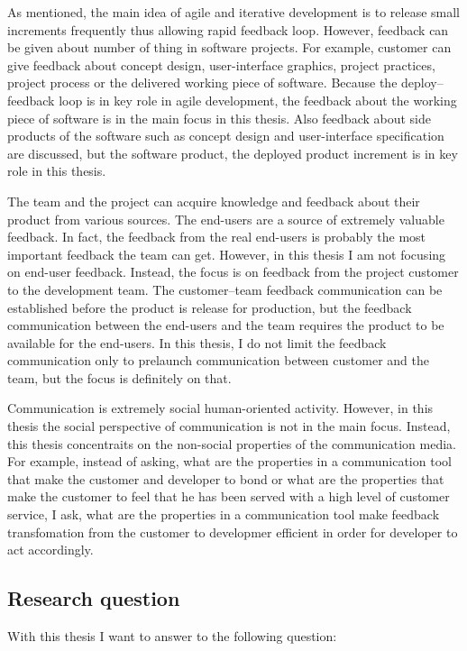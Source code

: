 \documentclass[english,12pt,a4paper,pdftex]{article}
\begin{document}
As mentioned, the main idea of agile and iterative development is to release small increments frequently thus allowing rapid feedback loop. However, feedback can be given about number of thing in software projects. For example, customer can give feedback about concept design, user-interface graphics, project practices, project process or the delivered working piece of software. Because the deploy--feedback loop is in key role in agile development, the feedback about the working piece of software is in the main focus in this thesis. Also feedback about side products of the software such as concept design and user-interface specification are discussed, but the software product, the deployed product increment is in key role in this thesis.

The team and the project can acquire knowledge and feedback about their product from various sources. The end-users are a source of extremely valuable feedback. In fact, the feedback from the real end-users is probably the most important feedback the team can get. However, in this thesis I am not focusing on end-user feedback. Instead, the focus is on feedback from the project customer to the development team. The customer--team feedback communication can be established before the product is release for production, but the feedback communication between the end-users and the team requires the product to be available for the end-users. In this thesis, I do not limit the feedback communication only to prelaunch communication between customer and the team, but the focus is definitely on that.

Communication is extremely social human-oriented activity. However, in this thesis the social perspective of communication is not in the main focus. Instead, this thesis concentraits on the non-social properties of the communication media. For example, instead of asking, what are the properties in a communication tool that make the customer and developer to bond or what are the properties that make the customer to feel that he has been served with a high level of customer service, I ask, what are the properties in a communication tool make feedback transfomation from the customer to developmer efficient in order for developer to act accordingly.

\subsection{Research question}

With this thesis I want to answer to the following question:
\end{document}
